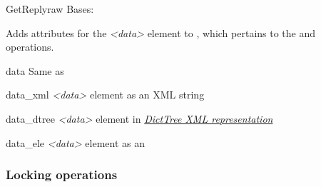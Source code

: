 \documentclass[a4paper,10pt,english]{manual}
\begin{document}
\hypertarget{ncclient.operations.GetReply}{}\begin{classdesc}{GetReply}{raw}
Bases: \hyperlink{ncclient.operations.rpc.RPCReply}{}

Adds attributes for the \emph{\textless{}data\textgreater{}} element to , which
pertains to the \hyperlink{ncclient.operations.Get}{} and \hyperlink{ncclient.operations.GetConfig}{} operations.

\hypertarget{ncclient.operations.GetReply.data}{}\begin{memberdesc}{data}
Same as \hyperlink{ncclient.operations.GetReply.data_ele}{}
\end{memberdesc}

\hypertarget{ncclient.operations.GetReply.data_xml}{}\begin{memberdesc}{data\_xml}
\emph{\textless{}data\textgreater{}} element as an XML string
\end{memberdesc}

\hypertarget{ncclient.operations.GetReply.data_dtree}{}\begin{memberdesc}{data\_dtree}
\emph{\textless{}data\textgreater{}} element in \hyperlink{dtree}{\emph{DictTree XML representation}}
\end{memberdesc}

\hypertarget{ncclient.operations.GetReply.data_ele}{}\begin{memberdesc}{data\_ele}
\emph{\textless{}data\textgreater{}} element as an \href{http://docs.python.org/library/xml.etree.elementtree.html\#xml.etree.ElementTree.Element}{}
\end{memberdesc}
\end{classdesc}


\subsubsection{Locking operations}
\end{document}
